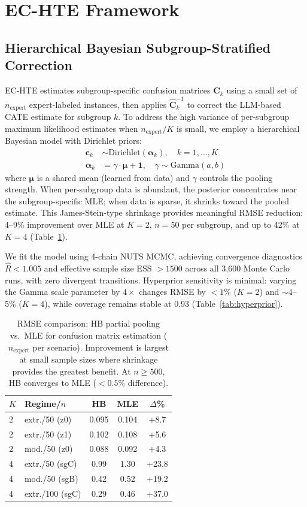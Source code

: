 \documentclass[11pt]{article}
\newcommand{\bC}{\mathbf{C}}
\begin{document}
\section{EC-HTE Framework}
\label{sec:method}

\subsection{Hierarchical Bayesian Subgroup-Stratified Correction}

EC-HTE estimates subgroup-specific confusion matrices $\hat{\bC}_k$ using a small set of $n_{\text{expert}}$ expert-labeled instances, then applies $\hat{\bC}_k^{-1}$ to correct the LLM-based CATE estimate for subgroup $k$.
To address the high variance of per-subgroup maximum likelihood estimates when $n_{\text{expert}}/K$ is small, we employ a hierarchical Bayesian model with Dirichlet priors:
\begin{align}
\boldsymbol{c}_k &\sim \text{Dirichlet}(\boldsymbol{\alpha}_k), \quad k = 1, \ldots, K \\
\boldsymbol{\alpha}_k &= \gamma \cdot \boldsymbol{\mu} + \mathbf{1}, \quad \gamma \sim \text{Gamma}(a, b)
\end{align}
where $\boldsymbol{\mu}$ is a shared mean (learned from data) and $\gamma$ controls the pooling strength.
When per-subgroup data is abundant, the posterior concentrates near the subgroup-specific MLE; when data is sparse, it shrinks toward the pooled estimate.
This James-Stein-type shrinkage provides meaningful RMSE reduction: 4--9\% improvement over MLE at $K{=}2$, $n{=}50$ per subgroup, and up to 42\% at $K{=}4$ (Table~\ref{tab:hb_mle}).

We fit the model using 4-chain NUTS MCMC, achieving convergence diagnostics $\hat{R} < 1.005$ and effective sample size ESS $> 1500$ across all 3,600 Monte Carlo runs, with zero divergent transitions.
Hyperprior sensitivity is minimal: varying the Gamma scale parameter by $4\times$ changes RMSE by $<1\%$ ($K{=}2$) and $\sim$4--5\% ($K{=}4$), while coverage remains stable at 0.93 (Table~\ref{tab:hyperprior}).

\begin{table}[t]
\centering
\small
\begin{tabular}{llccc}
\toprule
$K$ & Regime/$n$ & HB & MLE & $\Delta$\% \\
\midrule
2 & extr./50 (z0) & 0.095 & 0.104 & +8.7 \\
2 & extr./50 (z1) & 0.102 & 0.108 & +5.6 \\
2 & mod./50 (z0) & 0.088 & 0.092 & +4.3 \\
4 & extr./50 (sgC) & 0.99 & 1.30 & +23.8 \\
4 & mod./50 (sgB) & 0.42 & 0.52 & +19.2 \\
4 & extr./100 (sgC) & 0.29 & 0.46 & +37.0 \\
\bottomrule
\end{tabular}
\caption{RMSE comparison: HB partial pooling vs.\ MLE for confusion matrix estimation ($n_{\text{expert}}$ per scenario). Improvement is largest at small sample sizes where shrinkage provides the greatest benefit. At $n \geq 500$, HB converges to MLE ($<0.5\%$ difference).}
\label{tab:hb_mle}
\end{table}
\end{document}
